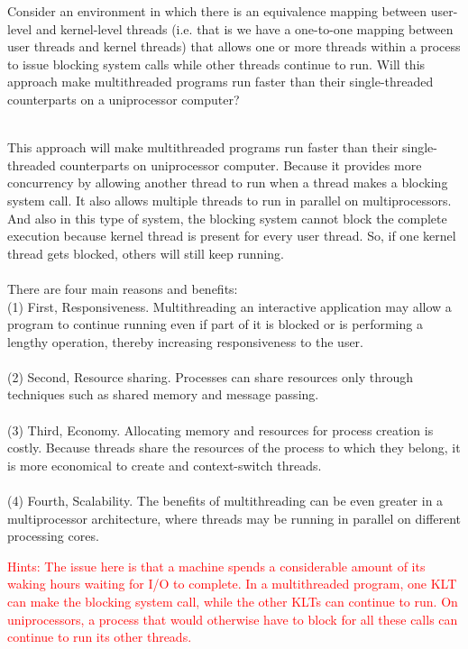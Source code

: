 \documentclass[12pt]{article}
\newenvironment{sol}[1][Solution]{\begin{trivlist}\item[\hskip\labelsep {\bfseries #1:}]}{\end{trivlist}}
\begin{document}
\begin{enumerate}
\newpage
\item Consider an environment in which there is an equivalence mapping between user-level and kernel-level threads (i.e. that is we have a one-to-one mapping between user threads and kernel threads) that allows one or more threads within a process to issue blocking system calls while other threads continue to run. Will this approach make multithreaded programs run faster than their single-threaded counterparts on a uniprocessor computer?
\begin{sol}
\hspace*{\fill} \\
This approach will make multithreaded programs run faster than their single-threaded counterparts on uniprocessor computer. Because it provides more concurrency by allowing another thread to run when a thread makes a blocking system call. It also allows multiple threads to run in parallel on multiprocessors. And also in this type of system, the blocking system cannot block the complete execution because kernel thread is present for every user thread. So, if one kernel thread gets blocked, others will still keep running. \\
\\
There are four main reasons and benefits: \\
(1) First, Responsiveness. Multithreading an interactive application may allow a program to continue running even if part of it is blocked or is performing a lengthy operation, thereby increasing responsiveness to the user. \\
\\
(2) Second, Resource sharing. Processes can share resources only through techniques such as shared memory and message passing. \\
\\
(3) Third, Economy. Allocating memory and resources for process creation is costly. Because threads share the resources of the process to which they belong, it is more economical to create and context-switch threads.\\
\\
(4) Fourth, Scalability. The benefits of multithreading can be even greater in a multiprocessor architecture, where threads may be running in parallel on different processing cores.\\

\end{sol}
\textcolor{red}{Hints: The issue here is that a machine spends a considerable amount of its waking hours waiting for I/O to complete. In a multithreaded program, one KLT can make the blocking system call, while the other KLTs can continue to run. On uniprocessors, a process that would otherwise have to block for all these calls can continue to run its other threads.}


\end{enumerate}
\end{document}
